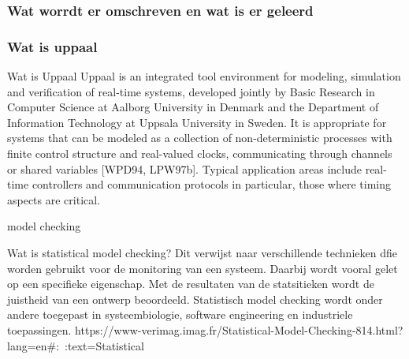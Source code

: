 \subsubsection{Wat worrdt er omschreven en wat is er geleerd}

\subsubsection{Wat is uppaal}

Wat is Uppaal
Uppaal is an integrated tool environment for modeling, simulation and verification of real-time systems, developed jointly by Basic Research in Computer Science at Aalborg University in Denmark and the Department of Information Technology at Uppsala University in Sweden. It is appropriate for systems that can be modeled as a collection of non-deterministic processes with finite control structure and real-valued clocks, communicating through channels or shared variables [WPD94, LPW97b]. Typical application areas include real-time controllers and communication protocols in particular, those where timing aspects are critical.


model checking

Wat is statistical model checking?
Dit verwijst naar verschillende technieken dfie worden gebruikt voor de monitoring van een systeem. Daarbij wordt vooral gelet op een specifieke eigenschap. Met de resultaten van de statsitieken wordt de juistheid van een ontwerp beoordeeld. Statistisch model checking wordt onder andere toegepast in systeembiologie, software engineering en industriele toepassingen.
https://www-verimag.imag.fr/Statistical-Model-Checking-814.html?lang=en#:~:text=Statistical%

